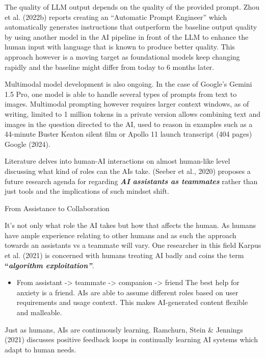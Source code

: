 \documentclass[
  letterpaper,
  DIV=11,
  numbers=noendperiod]{scrartcl}
\providecommand{\tightlist}{%
  \setlength{\itemsep}{0pt}\setlength{\parskip}{0pt}}\usepackage{longtable,booktabs,array}
\begin{document}
The quality of LLM output depends on the quality of the provided prompt.
Zhou et al. (2022b) reports creating an ``Automatic Prompt Engineer''
which automatically generates instructions that outperform the baseline
output quality by using another model in the AI pipeline in front of the
LLM to enhance the human input with language that is known to produce
better quality. This approach however is a moving target as foundational
models keep changing rapidly and the baseline might differ from today to
6 months later.

Multimodal model development is also ongoing. In the case of Google's
Gemini 1.5 Pro, one model is able to handle several types of prompts
from text to images. Multimodal prompting however requires larger
context windows, as of writing, limited to 1 million tokens in a private
version allows combining text and images in the question directed to the
AI, used to reason in examples such as a 44-minute Buster Keaton silent
film or Apollo 11 launch transcript (404 pages) Google (2024).

Literature delves into human-AI interactions on almost human-like level
discussing what kind of roles can the AIs take. (Seeber et al., 2020)
proposes a future research agenda for regarding \textbf{\emph{AI
assistants as teammates}} rather than just tools and the implications of
such mindset shift.

From Assistance to Collaboration

It's not only what role the AI takes but how that affects the human. As
humans have ample experience relating to other humans and as such the
approach towards an assistants vs a teammate will vary. One researcher
in this field Karpus et al. (2021) is concerned with humans treating AI
badly and coins the term \textbf{``\emph{algorithm
exploitation''}}\emph{.}

\begin{itemize}
\tightlist
\item
  From assistant -\textgreater{} teammate -\textgreater{} companion
  -\textgreater{} friend The best help for anxiety is a friend. AIs are
  able to assume different roles based on user requirements and usage
  context. This makes AI-generated content flexible and malleable.
\end{itemize}

Just as humans, AIs are continuously learning. Ramchurn, Stein \&
Jennings (2021) discusses positive feedback loops in continually
learning AI systems which adapt to human needs.
\end{document}
